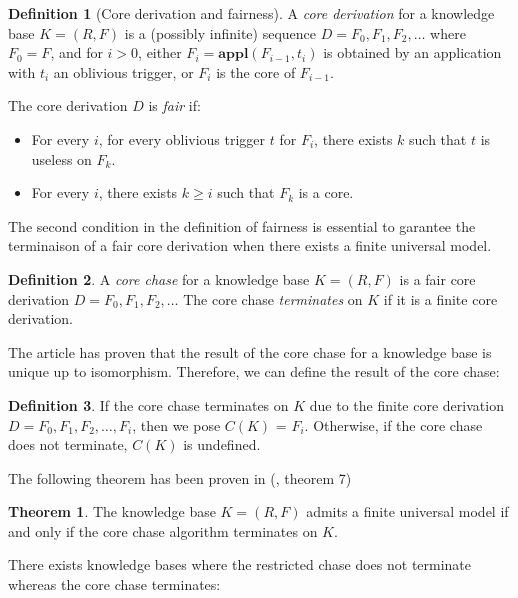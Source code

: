 \documentclass{article}
\theoremstyle{definition}
\newtheorem{definition}{Definition}[section]
\newtheorem{theorem}{Theorem}[section]
\theoremstyle{remark}
\newcommand{\Appl}{\textbf{appl}}
\begin{document}
\begin{definition}[Core derivation and fairness]
A \emph{core derivation} for a knowledge base $K = (R,F)$ is a (possibly infinite) sequence $D = F_0, F_1, F_2, \ldots$ where $F_0 = F$, and for $i >0$, either $F_{i}= \Appl(F_{i-1},t_i)$ is obtained by an application with $t_i$ an oblivious trigger, or $F_i$ is the core of $F_{i-1}$. 

The core derivation $D$ is \emph{fair} if:
\begin{itemize}
\item For every $i$, for every oblivious trigger $t$ for $F_i$, there exists $k$ such that $t$ is useless on $F_k$.
\item For every $i$, there exists $k \geq i$ such that $F_k$ is a core.

\end{itemize}
\end{definition}

The second condition in the definition of fairness is essential to garantee the terminaison of a fair core derivation when there exists a finite universal model.

\begin{definition}
A \emph{core chase} for a knowledge base $K= (R,F)$ is a fair core derivation $D=F_0,F_1,F_2,\ldots$ The core chase \emph{terminates} on $K$ if it is a finite core derivation.
\end{definition}

The article \cite{core_chase} has proven that the result of the core chase for a knowledge base is unique up to isomorphism. Therefore, we can define the result of the core chase:

\begin{definition}
If the core chase terminates on $K$ due to the finite core derivation $D=F_0,F_1,F_2,\ldots,F_i$, then we pose \emph{$\textit{C}(K)$} = $F_i$. Otherwise, if the core chase does not terminate, $\textit{C}(K)$ is undefined.
\end{definition}

The following theorem has been proven in (\cite{core_chase}, theorem 7)

\begin{theorem}
The knowledge base $K = (R,F)$ admits a finite universal model if and only if the core chase algorithm terminates on $K$.
\end{theorem}


There exists knowledge bases where the restricted chase does not terminate whereas the core chase terminates:
\end{document}
